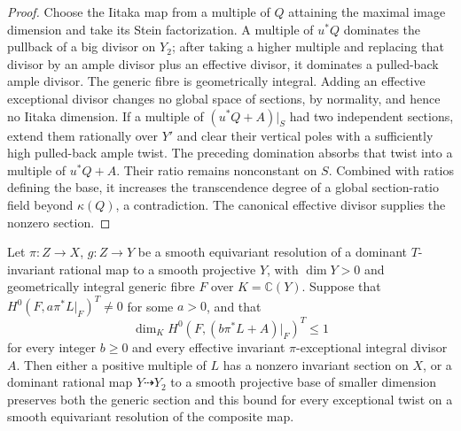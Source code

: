 \begin{proof}
Choose the Iitaka map from a multiple of $Q$ attaining the maximal image
dimension and take its Stein factorization.  A multiple of $u^*Q$
dominates the pullback of a big divisor on $Y_2$; after taking a higher
multiple and replacing that divisor by an ample divisor plus an
effective divisor, it dominates a pulled-back ample divisor.
The generic fibre is geometrically integral.
Adding an effective exceptional divisor changes no global space of
sections, by normality, and hence no Iitaka dimension.
If a multiple of $(u^*Q+A)|_S$ had two independent sections, extend
them rationally over $Y'$ and clear their vertical poles with a
sufficiently high pulled-back ample twist.  The preceding domination
absorbs that twist into a multiple of $u^*Q+A$.
Their ratio remains nonconstant on $S$.  Combined with ratios defining
the base, it increases the transcendence degree of a global section-ratio
field beyond $\kappa(Q)$, a contradiction.
The canonical effective divisor supplies the nonzero section.
\end{proof}

\begin{proposition}
\label{g:ba:exceptional-contraction}
Let $\pi:Z\to X$, $g:Z\to Y$ be a smooth equivariant resolution
of a dominant $T$-invariant rational map to a smooth projective $Y$,
with $\dim Y>0$ and geometrically integral generic fibre
$F$ over $K=\mathbb C(Y)$. Suppose that
$H^0(F,a\pi^*L|_F)^T\ne0$ for some $a>0$, and that
\[
 \dim_K H^0(F,(b\pi^*L+A)|_F)^T\leq1
\]
for every integer $b\geq0$ and every effective invariant
$\pi$-exceptional integral divisor $A$.
Then either a positive multiple of $L$ has a nonzero invariant section
on $X$, or a dominant rational map $Y\dashrightarrow Y_2$ to a smooth
projective base of smaller dimension preserves both the generic section
and this bound for every exceptional twist on a smooth equivariant
resolution of the composite map.
\end{proposition}

